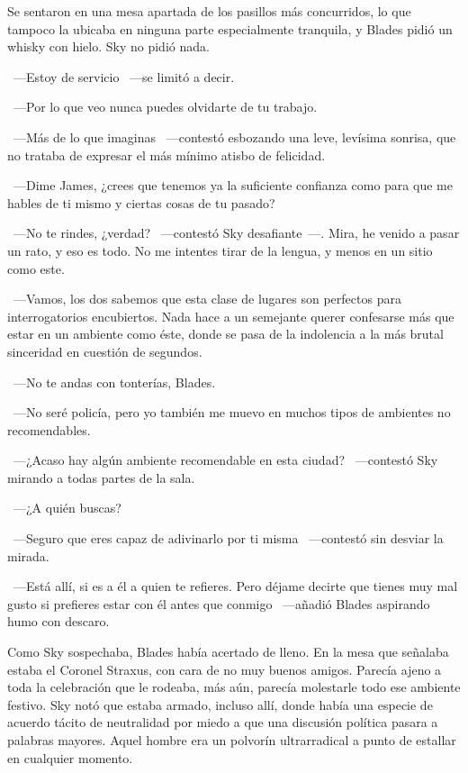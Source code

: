 Se sentaron en una mesa apartada de los pasillos más concurridos, lo que tampoco la ubicaba en ninguna parte especialmente tranquila, y Blades pidió un whisky con hielo. Sky no pidió nada.

~---Estoy de servicio ~---se limitó a decir.

~---Por lo que veo nunca puedes olvidarte de tu trabajo.

~---Más de lo que imaginas ~---contestó esbozando una leve, levísima sonrisa, que no trataba de expresar el más mínimo atisbo de felicidad.

~---Dime James, ¿crees que tenemos ya la suficiente confianza como para que me hables de ti mismo y ciertas cosas de tu pasado?

~---No te rindes, ¿verdad? ~---contestó Sky desafiante~---. Mira, he venido a pasar un rato, y eso es todo. No me intentes tirar de la lengua, y menos en un sitio como este.

~---Vamos, los dos sabemos que esta clase de lugares son perfectos para interrogatorios encubiertos. Nada hace a un semejante querer confesarse más que estar en un ambiente como éste, donde se pasa de la indolencia a la más brutal sinceridad en cuestión de segundos.

~---No te andas con tonterías, Blades.

~---No seré policía, pero yo también me muevo en muchos tipos de ambientes no recomendables.

~---¿Acaso hay algún ambiente recomendable en esta ciudad? ~---contestó Sky mirando a todas partes de la sala.

~---¿A quién buscas?

~---Seguro que eres capaz de adivinarlo por ti misma ~---contestó sin desviar la mirada.

~---Está allí, si es a él a quien te refieres. Pero déjame decirte que tienes muy mal gusto si prefieres estar con él antes que conmigo ~---añadió Blades aspirando humo con descaro.

Como Sky sospechaba, Blades había acertado de lleno. En la mesa que señalaba estaba el Coronel Straxus, con cara de no muy buenos amigos. Parecía ajeno a toda la celebración que le rodeaba, más aún, parecía molestarle todo ese ambiente festivo. Sky notó que estaba armado, incluso allí, donde había una especie de acuerdo tácito de neutralidad por miedo a que una discusión política pasara a palabras mayores. Aquel hombre era un polvorín ultrarradical a punto de estallar en cualquier momento.

